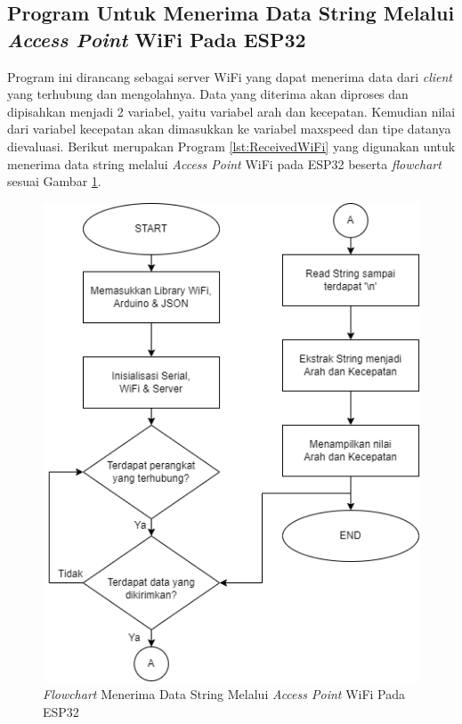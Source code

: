 \subsection{Program Untuk Menerima Data String Melalui \emph{Access Point} WiFi Pada ESP32}

Program ini dirancang sebagai server WiFi yang dapat menerima data dari \emph{client} yang terhubung dan mengolahnya. Data yang diterima akan diproses dan dipisahkan menjadi 2 variabel, yaitu variabel arah dan kecepatan. Kemudian nilai dari variabel kecepatan akan dimasukkan ke variabel maxspeed dan tipe datanya dievaluasi. Berikut merupakan Program \ref{lst:ReceivedWiFi} yang digunakan untuk menerima data string melalui \emph{Access Point} WiFi pada ESP32 beserta \emph{flowchart} sesuai Gambar \ref{fig:Flowchart 4 String}.

\begin{figure} [ht] \centering
  \includegraphics[scale=0.7]{gambar/program/4. String WiFi.png}
  \caption{\emph{Flowchart} Menerima Data String Melalui \emph{Access Point} WiFi Pada ESP32}
  \label{fig:Flowchart 4 String}
\end{figure}

